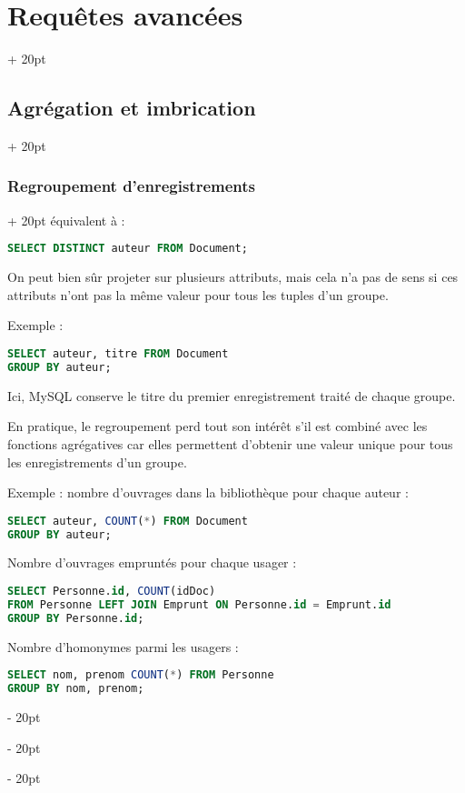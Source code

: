 \documentclass[a4paper, 12pt, twoside]{article}
\newcommand{\ind}[1][20pt]{\advance\leftskip + #1}
\newcommand{\deind}[1][20pt]{\advance\leftskip - #1}
\newenvironment{indt}[2][20pt]{#2 \par \ind[#1]}{\par \deind} %
\begin{document}
\begin{indt}{\section{Requêtes avancées}}
\begin{indt}{\subsection{Agrégation et imbrication}}
\begin{indt}{\subsubsection{Regroupement d'enregistrements}}
                équivalent à :

                \begin{lstlisting}[language=SQL, xleftmargin=80pt]
SELECT DISTINCT auteur FROM Document;\end{lstlisting}

                On peut bien sûr projeter sur plusieurs attributs, mais cela n'a pas de sens si ces attributs n'ont pas la même valeur pour tous les tuples d'un groupe.

                Exemple :

                \begin{lstlisting}[language=SQL, xleftmargin=80pt]
SELECT auteur, titre FROM Document
GROUP BY auteur;\end{lstlisting}

                Ici, MySQL conserve le titre du premier enregistrement traité de chaque groupe.

                \vspace{12pt}
                
                En pratique, le regroupement perd tout son intérêt s'il est combiné avec les fonctions agrégatives car elles permettent d'obtenir une valeur unique pour tous les enregistrements d'un groupe.

                Exemple : nombre d'ouvrages dans la bibliothèque pour chaque auteur :

                \begin{lstlisting}[language=SQL, xleftmargin=80pt]
SELECT auteur, COUNT(*) FROM Document
GROUP BY auteur;\end{lstlisting}

                Nombre d'ouvrages empruntés pour chaque usager :

                \begin{lstlisting}[language=SQL, xleftmargin=80pt]
SELECT Personne.id, COUNT(idDoc)
FROM Personne LEFT JOIN Emprunt ON Personne.id = Emprunt.id
GROUP BY Personne.id;\end{lstlisting}

                Nombre d'homonymes parmi les usagers :

                \begin{lstlisting}[language=SQL, xleftmargin=80pt]
SELECT nom, prenom COUNT(*) FROM Personne
GROUP BY nom, prenom;\end{lstlisting}
            \end{indt}

            \vspace{12pt}
            

\end{indt}
\end{indt}
\end{document}
